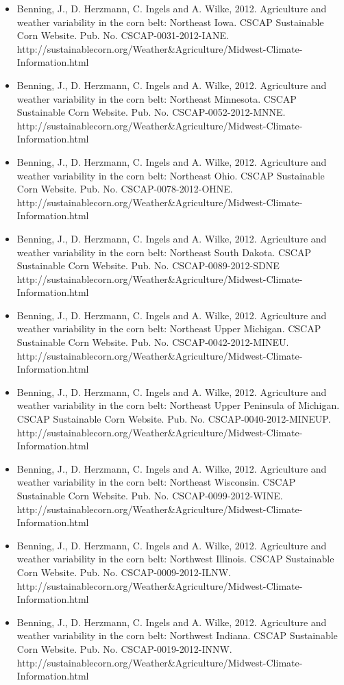 \begin{itemize}
\item Benning, J., D. Herzmann, C. Ingels and A. Wilke, 2012. Agriculture and weather variability in the corn belt: Northeast Iowa. CSCAP Sustainable Corn Website. Pub. No. CSCAP-0031-2012-IANE. http://sustainablecorn.org/Weather\&Agriculture/Midwest-Climate-Information.html
\item Benning, J., D. Herzmann, C. Ingels and A. Wilke, 2012. Agriculture and weather variability in the corn belt: Northeast Minnesota. CSCAP Sustainable Corn Website. Pub. No. CSCAP-0052-2012-MNNE. http://sustainablecorn.org/Weather\&Agriculture/Midwest-Climate-Information.html
\item Benning, J., D. Herzmann, C. Ingels and A. Wilke, 2012. Agriculture and weather variability in the corn belt: Northeast Ohio. CSCAP Sustainable Corn Website. Pub. No. CSCAP-0078-2012-OHNE. http://sustainablecorn.org/Weather\&Agriculture/Midwest-Climate-Information.html
\item Benning, J., D. Herzmann, C. Ingels and A. Wilke, 2012. Agriculture and weather variability in the corn belt: Northeast South Dakota. CSCAP Sustainable Corn Website. Pub. No. CSCAP-0089-2012-SDNE http://sustainablecorn.org/Weather\&Agriculture/Midwest-Climate-Information.html
\item Benning, J., D. Herzmann, C. Ingels and A. Wilke, 2012. Agriculture and weather variability in the corn belt: Northeast Upper Michigan. CSCAP Sustainable Corn Website. Pub. No. CSCAP-0042-2012-MINEU. http://sustainablecorn.org/Weather\&Agriculture/Midwest-Climate-Information.html
\item Benning, J., D. Herzmann, C. Ingels and A. Wilke, 2012. Agriculture and weather variability in the corn belt: Northeast Upper Peninsula of Michigan. CSCAP Sustainable Corn Website. Pub. No. CSCAP-0040-2012-MINEUP. http://sustainablecorn.org/Weather\&Agriculture/Midwest-Climate-Information.html
\item Benning, J., D. Herzmann, C. Ingels and A. Wilke, 2012. Agriculture and weather variability in the corn belt: Northeast Wisconsin. CSCAP Sustainable Corn Website. Pub. No. CSCAP-0099-2012-WINE. http://sustainablecorn.org/Weather\&Agriculture/Midwest-Climate-Information.html
\item Benning, J., D. Herzmann, C. Ingels and A. Wilke, 2012. Agriculture and weather variability in the corn belt: Northwest Illinois. CSCAP Sustainable Corn Website. Pub. No. CSCAP-0009-2012-ILNW. http://sustainablecorn.org/Weather\&Agriculture/Midwest-Climate-Information.html
\item Benning, J., D. Herzmann, C. Ingels and A. Wilke, 2012. Agriculture and weather variability in the corn belt: Northwest Indiana. CSCAP Sustainable Corn Website. Pub. No. CSCAP-0019-2012-INNW. http://sustainablecorn.org/Weather\&Agriculture/Midwest-Climate-Information.html

\end{itemize}
